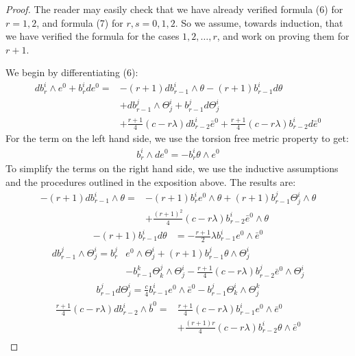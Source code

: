 \documentclass[11pt]{amsart}
\theoremstyle{definition}
\theoremstyle{definition}
\begin{document}
\begin{proof}  The reader may easily check that we have already verified formula (6) for $r=1,2$, and formula (7) for $r,s = 0,1,2$.  So we assume, towards induction, that we have verified the formula for the cases $1,2,\ldots,r$, and work on proving them for $r+1$.  

We begin by differentiating (6):
%
\begin{align*}
d b^i_r \wedge e^0 + b^i_r d e^0 = &-(r+1) d b^i_{r-1} \wedge \theta - (r+1) b^i_{r-1} d \theta \\
&+ d b^j_{r-1} \wedge \Theta^i_j + b^j_{r-1} d \Theta^i_j \\
&+ \frac{r+1}{4} (c - r \lambda) d b^i_{r-2} \bar{e}^0 + \frac{r+1}{4} (c - r \lambda) b^i_{r - 2} d \bar{e}^0
\end{align*} 
%
For the term on the left hand side, we use the torsion free metric property to get:
%
\begin{align*}
b^i_r \wedge d e^0 = - b^i_r \theta \wedge e^0
\end{align*}
%
To simplify the terms on the right hand side, we use the inductive assumptions and the procedures outlined in the exposition above.  The results are:
%
\begin{align*}
-(r+1) d b^i_{r-1} \wedge \theta = &-(r+1) b^i_r e^0 \wedge \theta + (r+1) b^j_{r-1} \Theta^i_j \wedge \theta  \\
&+ \frac{(r+1)^2}{4} (c - r \lambda) b^i_{r-2} \bar{e}^0 \wedge \theta 
\end{align*}
%
\begin{align*}
- (r+1) b^i_{r-1} d \theta &= - \frac{r+1}{2} \lambda b^i_{r-1} e^0 \wedge \bar{e}^0
\end{align*}
%
\begin{align*}
d b^j_{r-1} \wedge \Theta^i_j = b^j_{r} &e^0 \wedge \Theta^i_j + (r+1) b^j_{r-1} \theta \wedge \Theta^i_j \\
&- b^k_{r-1} \Theta^j_k \wedge \Theta^i_j - \frac{r+1}{4}(c - r \lambda) b^j_{r-2} \bar{e}^0 \wedge \Theta^i_j
\end{align*}
%
\begin{align*}
b^j_{r-1} d \Theta^i_j = \frac{c}{4} b^i_{r-1} e^0 \wedge \bar{e}^0 - b^j_{r-1} \Theta^i_k \wedge \Theta^k_j
\end{align*}
%
\begin{align*}
\frac{r+1}{4}(c-r \lambda) d b^i_{r-2} \wedge \bar{b}^0 = &\frac{r+1}{4} (c - r \lambda) b^i_{r-1} e^0 \wedge \bar{e}^0 \\
&+ \frac{ (r+1)r }{4}( c - r \lambda) b^i_{r-2} \theta \wedge \bar{e}^0 \\

\end{align*}
\end{proof}
\end{document}
